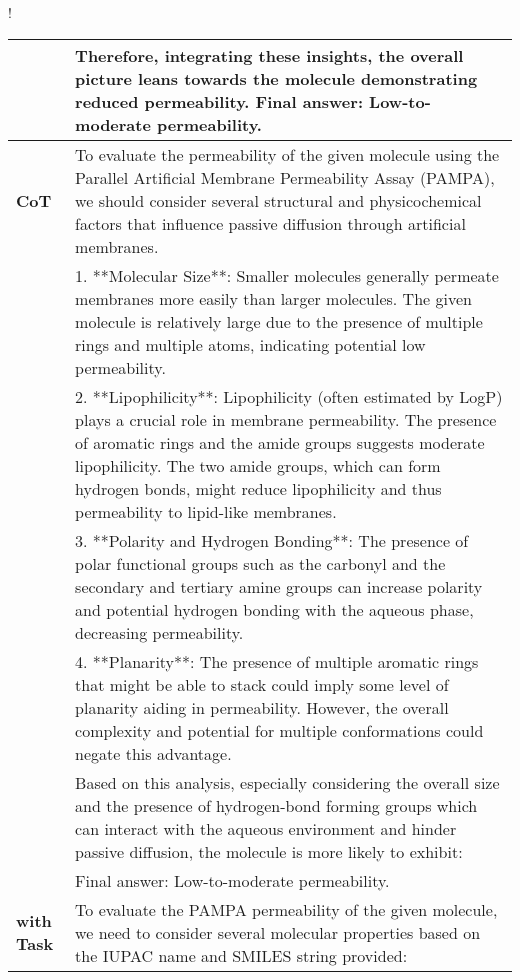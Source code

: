 \begin{table}[ht!]
\begin{resizebox}{\linewidth}{!}
{\begin{tabular}{p{1.2cm} p{18cm}}
& Therefore, integrating these insights, the overall picture leans towards the molecule demonstrating reduced permeability. \textcolor{tabred}{Final answer: Low-to-moderate permeability.} \\


\midrule


\textbf{CoT} & To evaluate the permeability of the given molecule using the Parallel Artificial Membrane Permeability Assay (PAMPA), we should consider several structural and physicochemical factors that influence passive diffusion through artificial membranes. \\

& 1. **Molecular Size**: Smaller molecules generally permeate membranes more easily than larger molecules. The given molecule is relatively large due to the presence of multiple rings and multiple atoms, indicating potential low permeability. \\

& 2. **Lipophilicity**: Lipophilicity (often estimated by LogP) plays a crucial role in membrane permeability. The presence of aromatic rings and the amide groups suggests moderate lipophilicity. The two amide groups, which can form hydrogen bonds, might reduce lipophilicity and thus permeability to lipid-like membranes. \\

& 3. **Polarity and Hydrogen Bonding**: The presence of polar functional groups such as the carbonyl and the secondary and tertiary amine groups can increase polarity and potential hydrogen bonding with the aqueous phase, decreasing permeability. \\

& 4. **Planarity**: The presence of multiple aromatic rings that might be able to stack could imply some level of planarity aiding in permeability. However, the overall complexity and potential for multiple conformations could negate this advantage. \\

& Based on this analysis, especially considering the overall size and the presence of hydrogen-bond forming groups which can interact with the aqueous environment and hinder passive diffusion, the molecule is more likely to exhibit: \\

& Final answer: Low-to-moderate permeability. \\

\midrule

\textbf{with Task} & To evaluate the PAMPA permeability of the given molecule, we need to consider several molecular properties based on the IUPAC name and SMILES string provided: \\


\end{tabular}}
\end{resizebox}
\end{table}
